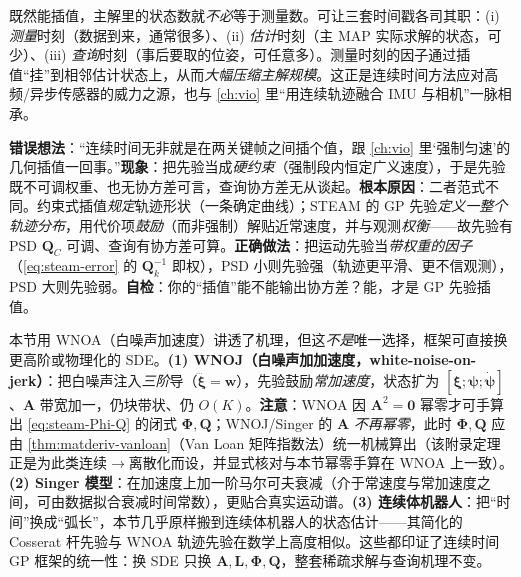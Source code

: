 \begin{insight}
既然能插值，主解里的状态数就\emph{不必}等于测量数。可让三套时间戳各司其职：(i) \emph{测量}时刻（数据到来，通常很多）、(ii) \emph{估计}时刻（主 MAP 实际求解的状态，可少）、(iii) \emph{查询}时刻（事后要取的位姿，可任意多）。测量时刻的因子通过插值“挂”到相邻估计状态上，从而\emph{大幅压缩主解规模}。这正是连续时间方法应对高频/异步传感器的威力之源，也与 \cref{ch:vio} 里“用连续轨迹融合 IMU 与相机”一脉相承。
\end{insight}

\begin{pitfall}
\textbf{错误想法}：“连续时间无非就是在两关键帧之间插个值，跟 \cref{ch:vio} 里‘强制匀速’的几何插值一回事。”\textbf{现象}：把先验当成\emph{硬约束}（强制段内恒定广义速度），于是先验既不可调权重、也无协方差可言，查询协方差无从谈起。\textbf{根本原因}：二者范式不同。约束式插值\emph{规定}轨迹形状（一条确定曲线）；STEAM 的 GP 先验\emph{定义一整个轨迹分布}，用代价项\emph{鼓励}（而非强制）解贴近常速度，并与观测\emph{权衡}——故先验有 PSD $\mathbf{Q}_C$ 可调、查询有协方差可算。\textbf{正确做法}：把运动先验当\emph{带权重的因子}（\cref{eq:steam-error} 的 $\mathbf{Q}_k^{-1}$ 即权），PSD 小则先验强（轨迹更平滑、更不信观测），PSD 大则先验弱。\textbf{自检}：你的“插值”能不能输出协方差？能，才是 GP 先验插值。
\end{pitfall}

\begin{insight}[同一框架的高阶与跨域推广]
本节用 WNOA（白噪声加速度）讲透了机理，但这\emph{不是}唯一选择，框架可直接换更高阶或物理化的 SDE。\textbf{(1) WNOJ（白噪声加加速度，white-noise-on-jerk）}\cite{tang2019wnoj}：把白噪声注入\emph{三阶}导（$\dddot{\boldsymbol{\xi}}=\mathbf{w}$），先验鼓励\emph{常加速度}，状态扩为 $[\boldsymbol{\xi};\boldsymbol{\psi};\dot{\boldsymbol{\psi}}]$、$\mathbf{A}$ 带宽加一，仍块带状、仍 $O(K)$。\textbf{注意}：WNOA 因 $\mathbf{A}^2=\mathbf{0}$ 幂零才可手算出 \cref{eq:steam-Phi-Q} 的闭式 $\boldsymbol{\Phi},\mathbf{Q}$；WNOJ/Singer 的 $\mathbf{A}$ \emph{不再幂零}，此时 $\boldsymbol{\Phi},\mathbf{Q}$ 应由 \cref{thm:matderiv-vanloan}（Van Loan 矩阵指数法）统一机械算出（该附录定理正是为此类连续$\to$离散化而设，并显式核对与本节幂零手算在 WNOA 上一致）。\textbf{(2) Singer 模型}\cite{wong2020singer}：在加速度上加一阶马尔可夫衰减（介于常速度与常加速度之间，可由数据拟合衰减时间常数），更贴合真实运动谱。\textbf{(3) 连续体机器人}\cite{lilge2022continuum}：把“时间”换成“弧长”，本节几乎原样搬到连续体机器人的状态估计——其简化的 Cosserat 杆先验与 WNOA 轨迹先验在数学上高度相似。这些都印证了连续时间 GP 框架的统一性：换 SDE 只换 $\mathbf{A},\mathbf{L},\boldsymbol{\Phi},\mathbf{Q}$，整套稀疏求解与查询机理不变。
\end{insight}

